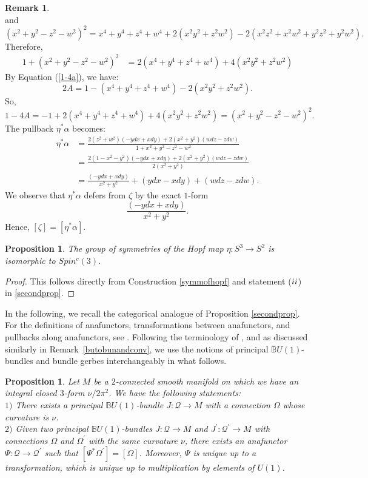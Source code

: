 \documentclass{article}
\theoremstyle{plain}
\newtheorem{prop}[thm]{Proposition}
\theoremstyle{definition}
\newtheorem{rem}[thm]{Remark}
\newcommand{\rNum}[1]{\lowercase\expandafter{\romannumeral #1\relax}}
\begin{document}
\begin{rem}
\begin{equation}
\end{equation}
and
\[
(x^2+y^2-z^2-w^2)^2 = x^4+y^4+z^4+w^4+2(x^2y^2+z^2w^2)-2(x^2z^2+x^2w^2+y^2z^2+y^2w^2).
\]
Therefore,
\begin{align*}
1 + (x^2+y^2-z^2-w^2)^2 & = 2(x^4+y^4+z^4+w^4)+4(x^2y^2+z^2w^2)
\end{align*}
By Equation (\ref{1-4a}), we have:
\[
2A = 1 - (x^4+y^4+z^4+w^4) - 2(x^2y^2+z^2w^2).
\]
So,
\[
1 - 4A = -1 + 2(x^4+y^4+z^4+w^4) + 4(x^2y^2+z^2w^2) = (x^2+y^2-z^2-w^2)^2.
\]
The pullback $\eta^\ast\alpha$ becomes:
\begin{align*}
\eta^\ast\alpha & =  \frac{2(z^2+w^2)(-ydx+xdy)+2(x^2+y^2)(wdz-zdw)}{1 + x^2+y^2-z^2-w^2} \\
& = \frac{2(1-x^2-y^2)(-ydx+xdy)+2(x^2+y^2)(wdz-zdw)}{2(x^2+y^2)} \\
& = \frac{(-ydx+xdy)}{x^2+y^2} + (ydx-xdy) + (wdz-zdw).
\end{align*}
We observe that $\eta^\ast \alpha$ defers from $\zeta$ by the exact $1$-form
\[
\frac{(-ydx+xdy)}{x^2+y^2}.
\]
Hence, $[\zeta] = [\eta^\ast \alpha]$.
\end{rem}
\begin{prop}\label{symmofhopfprop}
The group of symmetries of the Hopf map $\eta:S^3 \longrightarrow S^2$ is isomorphic to $Spin^c(3)$.
\end{prop}
\begin{proof}
This follows directly from Construction \ref{symmofhopf} and statement ($\rNum{2}$) in \ref{secondprop}.
\end{proof}
In the following, we recall the categorical analogue of Proposition \ref{secondprop}. For the definitions of anafunctors, transformations between anafunctors, and pullbacks along anafunctors, see \cite[Definition 2.3.1 on page 7 and Section 4.3]{MR3894086}. Following the terminology of \cite{MR3089401}, and as discussed similarly in Remark~\ref{butobunandconv}, we use the notions of principal $\mathbb{B}U(1)$-bundles and bundle gerbes interchangeably in what follows.
\begin{prop}\cite[Lemma 1.3.5 on page 17 and Theorem 1.3.6 on page 18]{Wal2007phd} \cite[Theorem 2.3 on page 101]{MR3013040} \cite[Corollary 2.3 on page 263]{MR2318389} \label{secondpropcat}
Let $M$ be a $2$-connected smooth manifold on which we have an integral closed $3$-form $\nu/{2\pi^2}$. We have the following statements: \\
$1)$ There exists a principal $\mathbb{B}U(1)$-bundle $J:\mathcal{Q} \longrightarrow M$ with a connection $\Omega$ whose curvature is $\nu$. \\
$2)$ Given two principal $\mathbb{B}U(1)$-bundles $J:\mathcal{Q} \longrightarrow M$ and $J^\prime:\mathcal{Q}^\prime \longrightarrow M$ with connections $\Omega$ and $\Omega^\prime$ with the
same curvature $\nu$, there exists an anafunctor $\Psi:\mathcal{Q} \longrightarrow \mathcal{Q}^\prime$ such that $[\Psi^\ast\Omega^\prime] = [\Omega]$. Moreover, $\Psi$ is unique up to a transformation, which is unique up to multiplication by elements of $U(1)$.
\end{prop}
\end{document}

